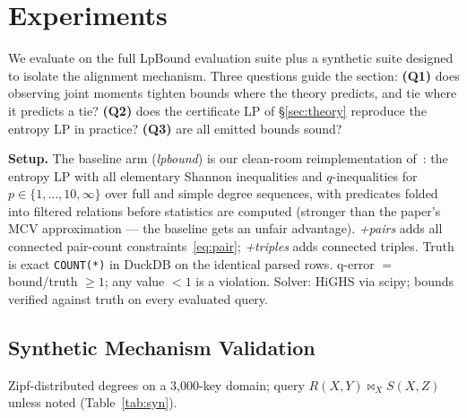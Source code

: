 \section{Experiments}
\label{sec:exp}

We evaluate \framework{} on the full LpBound evaluation suite plus a
synthetic suite designed to isolate the alignment mechanism.  Three
questions guide the section: \textbf{(Q1)} does observing joint
moments tighten bounds where the theory predicts, and tie where it
predicts a tie? \textbf{(Q2)} does the certificate LP of
\S\ref{sec:theory} reproduce the entropy LP in practice?
\textbf{(Q3)} are all emitted bounds sound?

\textbf{Setup.}  The baseline arm (\emph{lpbound}) is our clean-room
reimplementation of~\cite{zhang2025lpbound}: the entropy LP with all
elementary Shannon inequalities and $q$-inequalities for $p \in
\{1,\dots,10,\infty\}$ over full and simple degree sequences, with
predicates folded into filtered relations before statistics are
computed (stronger than the paper's MCV approximation --- the
baseline gets an unfair advantage).  \emph{+pairs} adds all connected
pair-count constraints~\eqref{eq:pair}; \emph{+triples} adds
connected triples.  Truth is exact \texttt{COUNT(*)} in DuckDB on the
identical parsed rows.  q-error $=$ bound/truth $\ge 1$; any value
$<1$ is a violation.  Solver: HiGHS via scipy; bounds verified
against truth on every evaluated query.

\subsection{Synthetic Mechanism Validation}
\label{sec:exp:syn}

Zipf-distributed degrees on a 3{,}000-key domain; query
$R(X,Y)\Join_X S(X,Z)$ unless noted (Table~\ref{tab:syn}).

\begin{table}[t]
\centering\small
\caption{Synthetic queries (q-err $=$ bound/truth; lower is better)}
\label{tab:syn}
\end{table}

